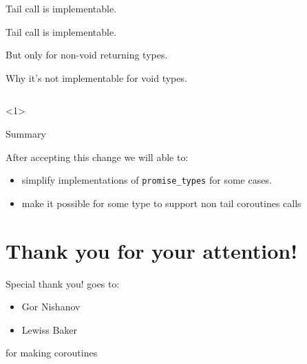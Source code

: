 \documentclass[10pt]{beamer}
\def \coroCpp {coroLexer.py -x}
\begin{document}
\begin{frame}{Tail call is implementable.}

\centerline{Tail call is implementable.}

\alert{But only for non-void returning types.}

\end{frame}

\begin{frame}{Why it's not implementable for void types.}

\inputminted{\coroCpp}{code-examples/retval-retvoid/void-example.cpp}


<1>

\pause
\pause


\end{frame}

\begin{frame}{Summary}

After accepting this change we will able to:

\begin{itemize}[<+-|alert@+>]
\item simplify implementations of \texttt{promise\_types} for some cases.
\item make it possible for some type to \alert{support non tail coroutines calls}
\end{itemize}


\end{frame}

\section*{Thank you for your attention!}

\begin{frame}{Special thank you! goes to:}
	\begin{itemize}
		\item Gor Nishanov
		\item Lewiss Baker	
	\end{itemize}

	for making coroutines 
\end{frame}
\end{document}
